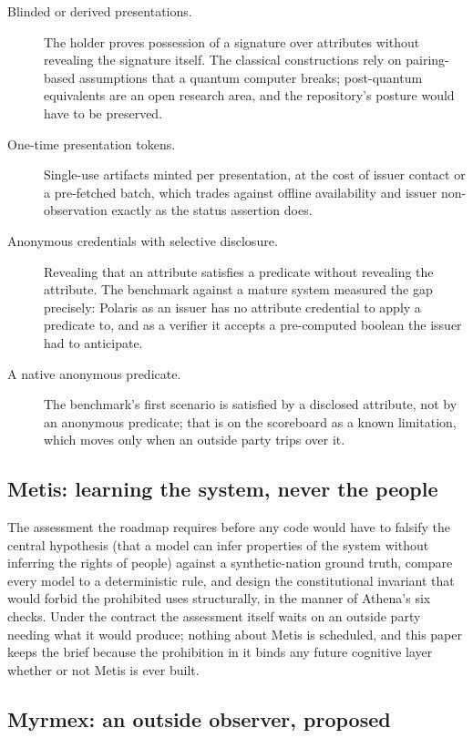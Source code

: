 \begin{description}
  \item[Blinded or derived presentations.] The holder proves possession of a signature over
    attributes without revealing the signature itself. The classical constructions rely on
    pairing-based assumptions that a quantum computer breaks; post-quantum equivalents are an open
    research area, and the repository's posture would have to be preserved.
  \item[One-time presentation tokens.] Single-use artifacts minted per presentation, at the cost of
    issuer contact or a pre-fetched batch, which trades against offline availability and issuer
    non-observation exactly as the status assertion does.
  \item[Anonymous credentials with selective disclosure.] Revealing that an attribute satisfies a
    predicate without revealing the attribute. The benchmark against a mature system measured the
    gap precisely: Polaris as an issuer has no attribute credential to apply a predicate to, and as a
    verifier it accepts a pre-computed boolean the issuer had to anticipate.
  \item[A native anonymous predicate.] The benchmark's first scenario is satisfied by a disclosed
    attribute, not by an anonymous predicate; that is on the scoreboard as a known limitation, which
    moves only when an outside party trips over it.
\end{description}

\subsection{Metis: learning the system, never the people}

The assessment the roadmap requires before any code would have to falsify the central hypothesis
(that a model can infer properties of the system without inferring the rights of people) against a
synthetic-nation ground truth, compare every model to a deterministic rule, and design the
constitutional invariant that would forbid the prohibited uses structurally, in the manner of
Athena's six checks. Under the contract the assessment itself waits on an outside party needing
what it would produce; nothing about Metis is scheduled, and this paper keeps the brief because the
prohibition in it binds any future cognitive layer whether or not Metis is ever built.

\subsection{Myrmex: an outside observer, proposed}

